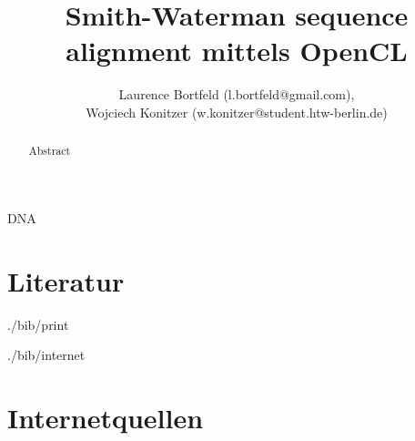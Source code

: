 \documentclass[journal]{IEEEtran}
\begin{document}
\title{Smith-Waterman sequence alignment mittels OpenCL}
\author{
  Laurence Bortfeld (l.bortfeld@gmail.com), \\
  Wojciech Konitzer (w.konitzer@student.htw-berlin.de)
}

\maketitle

\begin{abstract}
Abstract
\end{abstract}

\begin{IEEEkeywords}
  DNA
\end{IEEEkeywords}



\section*{Literatur}

\begin{btSect}{./bib/print}
\btPrintCited
\end{btSect}

\begin{btSect}{./bib/internet}
\section*{Internetquellen}
\btPrintCited
\end{btSect}
\end{document}

